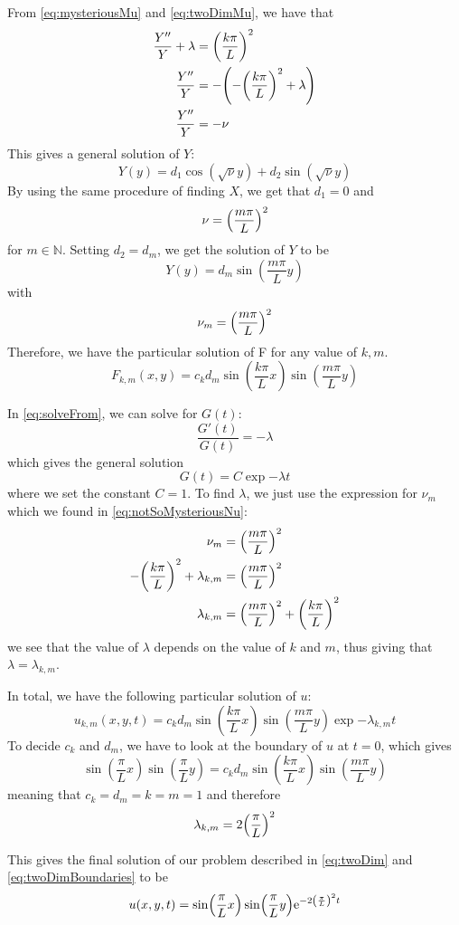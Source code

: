 From \vref{eq:mysteriousMu} and \vref{eq:twoDimMu}, we have that
\begin{align*}
\frac{Y''}{Y} +\lambda  &=\qty(\frac{k\pi}{L})^2 \\
\frac{Y''}{Y}&=-\qty(-\qty(\frac{k\pi}{L})^2 + \lambda ) \\
\frac{Y''}{Y}&=-\nu
\end{align*}
This gives a general solution of \(Y\):
\[
Y(y) = d_1\cos(\sqrt{\nu}y) + d_2\sin(\sqrt{\nu}y)
\]
By using the same procedure of finding \(X\), we get that \(d_1 = 0\) and
\[
\nu = \qty(\frac{m\pi}{L})^2
\]
for \(m \in \mathbb{N}\). Setting \(d_2 = d_m\), we get the solution of \(Y\) to be
\[
Y(y) = d_m\sin(\frac{m\pi}{L}y)
\]
with
\begin{equation}\label{eq:notSoMysteriousNu}
\nu_m = \qty(\frac{m\pi}{L})^2
\end{equation}
Therefore, we have the particular solution of F for any value of \(k,m\).
\[
F_{k,m}(x,y) = c_kd_m\sin(\frac{k\pi}{L}x)\sin(\frac{m\pi}{L}y)
\]

In \vref{eq:solveFrom}, we can solve for \(G(t)\):
\[
\frac{G'(t)}{G(t)}  = -\lambda
\]
which gives the general solution
\[
G(t) = C\exp{-\lambda t}
\]
where we set the constant \(C = 1\). To find \(\lambda\), we just use the expression for \(\nu_m\) which we found in \vref{eq:notSoMysteriousNu}:
\begin{align*}
\nu_m &= \qty(\frac{m\pi}{L})^2 \\
-\qty(\frac{k\pi}{L})^2 + \lambda_{k,m} &= \qty(\frac{m\pi}{L})^2  \\
\lambda_{k,m} &= \qty(\frac{m\pi}{L})^2+\qty(\frac{k\pi}{L})^2
\end{align*}
we see that the value of \(\lambda \) depends on the value of \(k\) and \(m\), thus giving that \(\lambda = \lambda_{k,m}\).

In total, we have the following particular solution of \(u\):
\[
u_{k,m}(x,y,t) =  c_kd_m\sin(\frac{k\pi}{L}x)\sin(\frac{m\pi}{L}y)\exp{-\lambda_{k,m} t}
\]
To decide \(c_k\) and \(d_m\), we have to look at the boundary of \(u\) at \(t = 0\), which gives
\[
\sin(\frac{\pi}{L}x)\sin(\frac{\pi}{L}y) =  c_kd_m\sin(\frac{k\pi}{L}x)\sin(\frac{m\pi}{L}y)
\]
meaning that \(c_k = d_m = k = m = 1\) and therefore
\[
\lambda_{k,m} = 2\qty(\frac{\pi}{L})^2
\]

This gives the final solution of our problem described in \vref{eq:twoDim} and \vref{eq:twoDimBoundaries} to be
\[
u(x,y,t) = \sin(\frac{\pi}{L}x)\sin(\frac{\pi}{L}y)\mathrm{e}^{-2\qty(\frac{\pi}{L})^2 t}
\]


